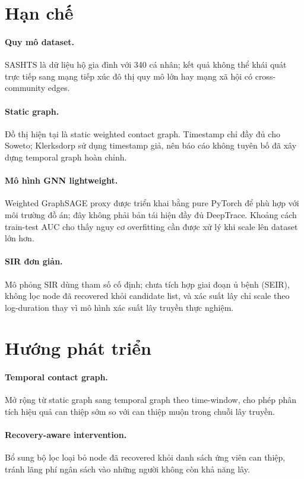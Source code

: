 \documentclass[12pt,a4paper]{report}
\theoremstyle{definition}
\begin{document}
\section{Hạn chế}

\paragraph{Quy mô dataset.} SASHTS là dữ liệu hộ gia đình với 340 cá nhân; kết quả không thể khái quát trực tiếp sang mạng tiếp xúc đô thị quy mô lớn hay mạng xã hội có cross-community edges.

\paragraph{Static graph.} Đồ thị hiện tại là static weighted contact graph. Timestamp chỉ đầy đủ cho Soweto; Klerksdorp sử dụng timestamp giả, nên báo cáo không tuyên bố đã xây dựng temporal graph hoàn chỉnh.

\paragraph{Mô hình GNN lightweight.} Weighted GraphSAGE proxy được triển khai bằng pure PyTorch để phù hợp với môi trường đồ án; đây không phải bản tái hiện đầy đủ DeepTrace. Khoảng cách train-test AUC cho thấy nguy cơ overfitting cần được xử lý khi scale lên dataset lớn hơn.

\paragraph{SIR đơn giản.} Mô phỏng SIR dùng tham số cố định; chưa tích hợp giai đoạn ủ bệnh (SEIR), không lọc node đã recovered khỏi candidate list, và xác suất lây chỉ scale theo log-duration thay vì mô hình xác suất lây truyền thực nghiệm.

\section{Hướng phát triển}

\paragraph{Temporal contact graph.} Mở rộng từ static graph sang temporal graph theo time-window, cho phép phân tích hiệu quả can thiệp sớm so với can thiệp muộn trong chuỗi lây truyền.

\paragraph{Recovery-aware intervention.} Bổ sung bộ lọc loại bỏ node đã recovered khỏi danh sách ứng viên can thiệp, tránh lãng phí ngân sách vào những người không còn khả năng lây.
\end{document}
